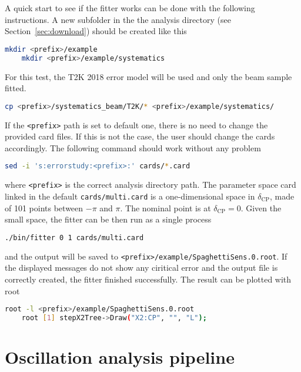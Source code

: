 \documentclass[a4paper, 11pt]{article}
\newcommand{\refsec}[1]{Section~\ref{#1}}
\begin{document}
A quick start to see if the fitter works can be done with the following instructions.
A new subfolder in the the analysis directory (see \refsec{sec:download}) should be created like this
\begin{lstlisting}[language=bash]
	mkdir <prefix>/example
	mkdir <prefix>/example/systematics
\end{lstlisting}
For this test, the T2K 2018 error model will be used and only the beam sample fitted.
\begin{lstlisting}[language=bash]
	cp <prefix>/systematics_beam/T2K/* <prefix>/example/systematics/
\end{lstlisting}
If the \texttt{<prefix>} path is set to default one, there is no need to change the provided card files.  
If this is not the case, the user should change the cards accordingly.
The following command should work without any problem
\begin{lstlisting}[language=bash]
	sed -i 's:errorstudy:<prefix>:' cards/*.card
\end{lstlisting}
where \texttt{<prefix>} is the correct analysis directory path.
The parameter space card linked in the default \texttt{cards/multi.card} is a one-dimensional space in %
$\delta_\text{CP}$, made of 101 points between $-\pi$ and $\pi$.
The nominal point is at $\delta_\text{CP} = 0$.
Given the small space, the fitter can be then run as a single process
\begin{lstlisting}[language=bash]
	./bin/fitter 0 1 cards/multi.card
\end{lstlisting}
and the output will be saved to \texttt{<prefix>/example/SpaghettiSens.0.root}.
If the displayed messages do not show any ciritical error and the output file %
is correctly created, the fitter finished successfully.
The result can be plotted with root
\begin{lstlisting}[language=bash]
	root -l <prefix>/example/SpaghettiSens.0.root
	root [1] stepX2Tree->Draw("X2:CP", "", "L");
\end{lstlisting}

\section{Oscillation analysis pipeline}
\end{document}
